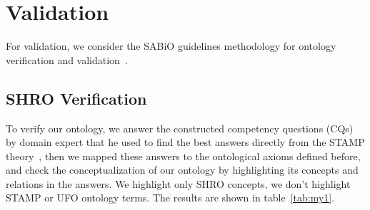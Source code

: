 \documentclass[sw]{iosart2x}
\newcommand{\sabio}[0]{SABiO}
\newcommand{\term}[1]{\textnormal{\textsf{#1}}}
\begin{document}
\section{Validation}
For validation, we consider the \sabio{} guidelines methodology for ontology verification and validation~\cite{DeAlmeidaFalbo2014}.
\subsection{SHRO Verification}
To verify our ontology, we answer the constructed competency questions \term{(CQs)} by domain expert that he used to find the best answers directly from the STAMP theory~\cite{leveson2012engineering}, then we mapped these answers to the ontological axioms defined before, and check the conceptualization of our ontology by highlighting its concepts and relations in the answers. We highlight only SHRO concepts, we don't highlight STAMP or UFO ontology terms. The results are shown in table~\ref{tab:my1}.
\end{document}
